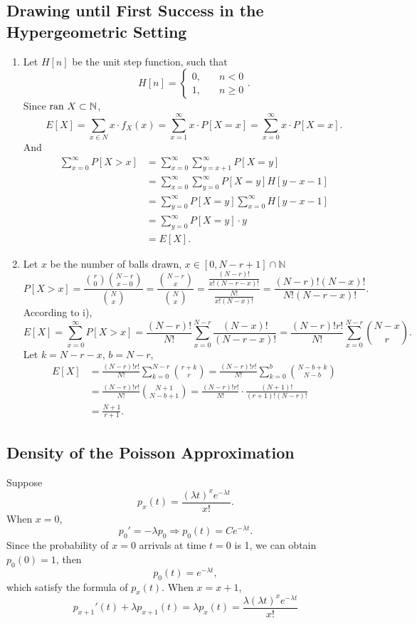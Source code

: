 \documentclass[11pt,a4paper]{article}
\author{Group 37}
\subtitle{Assignment}
\begin{document}
\maketitle

\subsection{Drawing until First Success in the Hypergeometric Setting}

\begin{enumerate}[label=\roman*)]
\item
Let $H[n]$ be the unit step function, such that 
$$H[n]=\left\{\begin{aligned}
0,&\quad n<0\\1,&\quad n\geqslant 0
\end{aligned}\right..$$
Since ${\rm ran}\ X\subset \mathbb{N}$,
$$E[X]=\sum_{x\in N}x\cdot f_X(x)=\sum_{x=1}^\infty x\cdot P[X=x]=\sum_{x=0}^\infty x\cdot P[X=x].$$
And
\begin{align*}
\sum_{x=0}^\infty P[X>x]
&=\sum_{x=0}^\infty\sum_{y=x+1}^\infty P[X=y]\\
&=\sum_{x=0}^\infty\sum_{y=0}^\infty P[X=y]H[y-x-1]\\
&=\sum_{y=0}^\infty P[X=y]\sum_{x=0}^\infty H[y-x-1]\\
&=\sum_{y=0}^\infty P[X=y]\cdot y\\
&=E[X].
\end{align*}
\item
Let $x$ be the number of balls drawn, $x\in [0,N-r+1]\cap\mathbb{N}$
$$P[X>x]=\frac{\binom{r}{0}\binom{N-r}{x-0}}{\binom{N}{x}}=\frac{\binom{N-r}{x}}{\binom{N}{x}}=\frac{\frac{(N-r)!}{x!(N-r-x)!}}{\frac{N!}{x!(N-x)!}}=\frac{(N-r)!(N-x)!}{N!(N-r-x)!}.$$
According to i),
$$E[X]=\sum_{x=0}^\infty P[X>x]=\frac{(N-r)!}{N!}\sum_{x=0}^{N-r} \frac{(N-x)!}{(N-r-x)!}=\frac{(N-r)!r!}{N!}\sum_{x=0}^{N-r}\binom{N-x}{r}.$$
Let $k=N-r-x$, $b=N-r$,
\begin{align*}
E[X]&=\frac{(N-r)!r!}{N!}\sum_{k=0}^{N-r}\binom{r+k}{r}
=\frac{(N-r)!r!}{N!}\sum_{k=0}^{b}\binom{N-b+k}{N-b}\\
&=\frac{(N-r)!r!}{N!}\binom{N+1}{N-b+1}
=\frac{(N-r)!r!}{N!}\cdot\frac{(N+1)!}{(r+1)!(N-r)!}\\
&=\frac{N+1}{r+1}.
\end{align*}
\end{enumerate}

\subsection{Density of the Poisson Approximation}

Suppose $$p_x(t)=\frac{(\lambda t)^xe^{-\lambda t}}{x!}.$$
When $x=0$,
$$p_0'=-\lambda p_0\Longrightarrow p_0(t)=Ce^{-\lambda t}.$$
Since the probability of $x=0$ arrivals at time $t=0$ is 1, we can obtain $p_0(0)=1$, then
$$p_0(t)=e^{-\lambda t},$$
which satisfy the formula of $p_x(t)$.
When $x=x+1$,
$$p_{x+1}'(t)+\lambda p_{x+1}(t)=\lambda p_x(t)=\frac{\lambda(\lambda t)^xe^{-\lambda t}}{x!}$$
\end{document}
